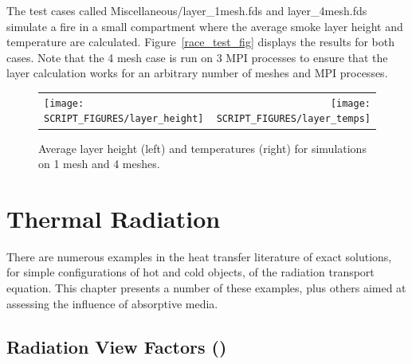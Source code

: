 \documentclass[11pt]{book}
\begin{document}
The test cases called {\ct Miscellaneous/layer\_1mesh.fds} and {\ct layer\_4mesh.fds} simulate a fire in a small compartment where the average smoke layer height and temperature are calculated. Figure~\ref{race_test_fig} displays the results for both cases. Note that the 4 mesh case is run on 3 MPI processes to ensure that the layer calculation works for an arbitrary number of meshes and MPI processes.

\begin{figure}[!ht]
\begin{tabular*}{\textwidth}{lr}
\texttt{[image: SCRIPT\_FIGURES/layer\_height]} &
\texttt{[image: SCRIPT\_FIGURES/layer\_temps]}
\end{tabular*}
\caption[Result of the  test cases]{Average layer height (left) and temperatures (right) for simulations on 1 mesh and 4 meshes.}
\label{layer_fig}
\end{figure}




\chapter{Thermal Radiation}

There are numerous examples in the heat transfer literature of exact solutions, for simple configurations of hot and cold objects, of the radiation transport equation. This chapter presents a number of these examples, plus others aimed at assessing the influence of absorptive media.

\section{Radiation View Factors (\texorpdfstring{}{plate\_view\_factor}) }
\label{plate_view_factor}
\end{document}
